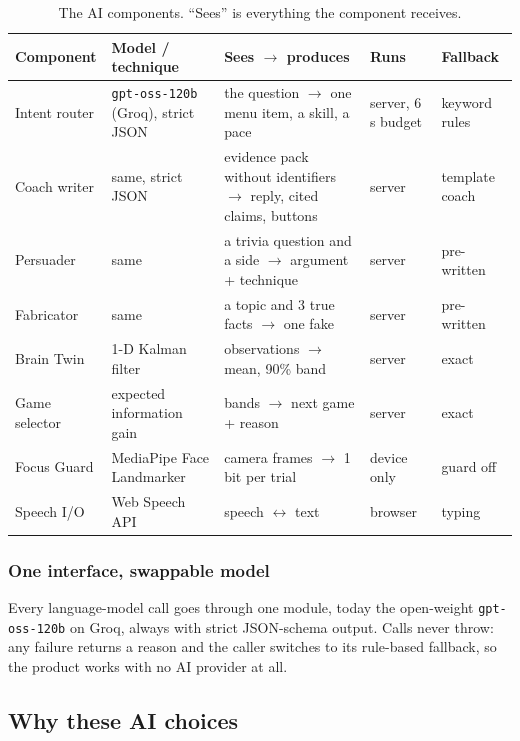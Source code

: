 \documentclass[11pt,a4paper]{article}
\newcommand{\code}[1]{\texttt{\small #1}}
\begin{document}
\begin{table}[H]
\centering\small
\caption{The AI components. ``Sees'' is everything the component receives.}
\label{tab:components}
\begin{tabularx}{\linewidth}{@{}>{\raggedright}p{2.35cm} >{\raggedright}p{3.1cm} >{\raggedright}X >{\raggedright}p{2.4cm} >{\raggedright\arraybackslash}p{2.5cm}@{}}
\toprule
Component & Model / technique & Sees $\rightarrow$ produces & Runs & Fallback\\
\midrule
Intent router & \code{gpt-oss-120b} (Groq), strict JSON & the question $\rightarrow$ one menu item, a skill, a pace & server, 6\,s budget & keyword rules\\
Coach writer & same, strict JSON & evidence pack without identifiers $\rightarrow$ reply, cited claims, buttons & server & template coach\\
Persuader & same & a trivia question and a side $\rightarrow$ argument + technique & server & pre-written\\
Fabricator & same & a topic and 3 true facts $\rightarrow$ one fake & server & pre-written\\
Brain Twin & 1-D Kalman filter & observations $\rightarrow$ mean, 90\% band & server & exact\\
Game selector & expected information gain & bands $\rightarrow$ next game + reason & server & exact\\
Focus Guard & MediaPipe Face Landmarker & camera frames $\rightarrow$ 1 bit per trial & device only & guard off\\
Speech I/O & Web Speech API & speech $\leftrightarrow$ text & browser & typing\\
\bottomrule
\end{tabularx}
\end{table}

\subsubsection{One interface, swappable model} Every language-model call goes through one module, today the open-weight \code{gpt-oss-120b} on Groq, always with strict JSON-schema output. Calls never throw: any failure returns a reason and the caller switches to its rule-based fallback, so the product works with no AI provider at all.

\subsection{Why these AI choices}
\end{document}
